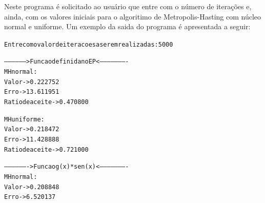 \documentclass [a4paper,10pt]{article}
\begin{document}
		Neste programa é solicitado ao usuário que entre com o número de iterações
		e, ainda, com os valores iniciais para o algoritimo de Metropolis-Hasting
		com núcleo normal e uniforme. Um exemplo da saida do programa é apresentada a seguir:
		\begin{alltt}
			\indent Entre com o valor de iteracoes a serem realizadas: 5000

			\indent ------------------> Funcao definida no EP <----------------------
			\indent MH normal:
					\hspace{10mm}Valor -> 0.222752
					\hspace{10mm}Erro -> 13.611951%
					\hspace{10mm}Ratio de aceite -> 0.470800

			\indent MH uniforme:
					\hspace{10mm}Valor -> 0.218472
					\hspace{10mm}Erro -> 11.428888%
					\hspace{10mm}Ratio de aceite -> 0.721000

			\indent -------------------> Funcao g(x) * sen(x) <----------------------
			\indent MH normal:
					\hspace{10mm}Valor -> 0.208848
					\hspace{10mm}Erro -> 6.520137%


\end{alltt}
\end{document}
